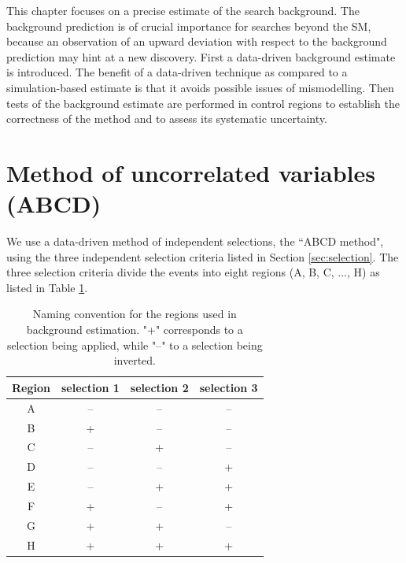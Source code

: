 This chapter focuses on a precise estimate of the search background. The
background prediction is of crucial importance for searches beyond the SM, because an observation
of an upward deviation with respect to the background prediction may hint at a new discovery.
First a data-driven background estimate is introduced. The benefit of a data-driven technique
as compared to a simulation-based estimate is that it avoids possible issues of 
mismodelling. Then tests of the background estimate are performed 
in control regions to establish the correctness of the method and to assess
its systematic uncertainty.


\section{Method of uncorrelated variables (ABCD)}
\label{sec:abcd}
We use a data-driven method of independent selections, the ``ABCD method", using
 the three independent selection criteria listed in Section \ref{sec:selection}. 
The three selection criteria divide the events into eight
regions (A, B, C, ..., H) as listed in Table \ref{tab:regions}.

\begin{table}[htbp]
\centering
\caption{Naming convention for the regions used in background estimation. "+" corresponds to a selection 
being applied, while "--" to a selection being inverted. \label{tab:regions}}
\begin{tabular}{cccc}
 \hline
  Region & selection 1 & selection 2 & selection 3 \\
 \hline
 A & -- & -- & -- \\
 B & + & -- & -- \\
 C & -- & + & -- \\
 D & -- & -- & + \\
 E & -- & + & + \\
 F & + & -- & + \\
 G & + & + & -- \\
 H & + & + & + \\
\hline
\end{tabular} 
\end{table}

